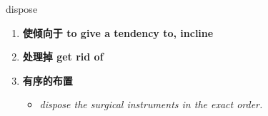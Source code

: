 
\begin{frame}
{\huge dispose}
\begin{center}
\begin{enumerate}\Large
  \item \textbf{使倾向于 to give a tendency to, incline}
  \item \textbf{处理掉 get rid of}
  \item \textbf{有序的布置}
  \begin{itemize}
    \item \em{\Large{dispose the surgical instruments in the exact order.}}
  \end{itemize}
\end{enumerate}
\end{center}
\end{frame}
